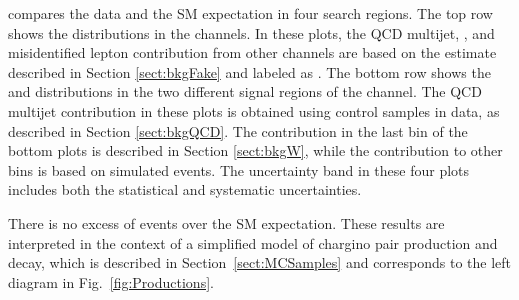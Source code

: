 compares the data and the SM expectation in four search regions. The top row 
shows the \mttwo distributions in the \leptonTau channels. 
In these plots, the QCD multijet, \wjets, and misidentified lepton contribution from other channels 
are based on the estimate described in Section \ref{sect:bkgFake} and labeled as \wjets.
The bottom row shows the \mttwo and \SumMT distributions in the two different signal regions of the \tauTau channel. 
The QCD multijet contribution in these plots is obtained using control samples in data, as described in 
Section \ref{sect:bkgQCD}. The \wjets contribution in 
the last bin of the bottom plots is described in Section \ref{sect:bkgW}, while the contribution to other bins is based on simulated events.
The uncertainty band in these four plots includes both the statistical and systematic uncertainties.

There is no excess of events over the SM expectation.  These results are interpreted in the context
of a simplified model of chargino pair production and decay, which is described in Section~\ref{sect:MCSamples} and corresponds 
to the left diagram in Fig.~\ref{fig:Productions}. 

